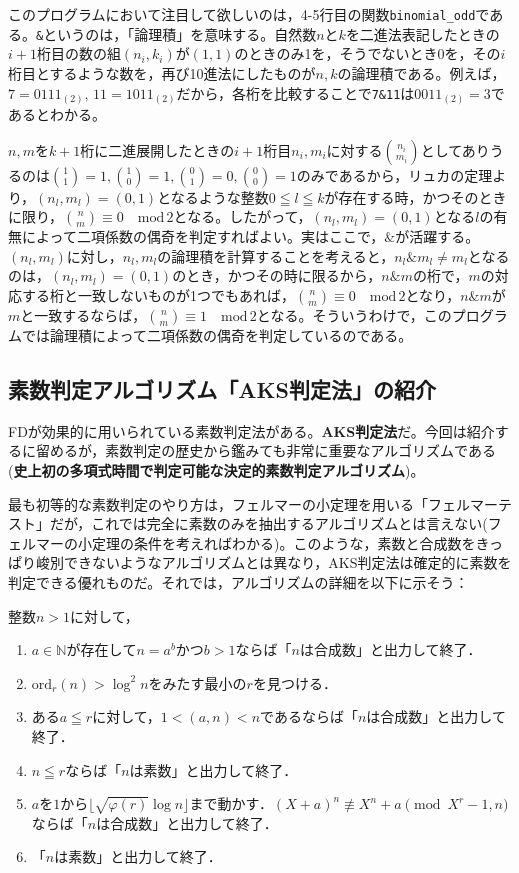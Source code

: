 このプログラムにおいて注目して欲しいのは，4-5行目の関数\texttt{binomial\_odd}である。\texttt{\&}というのは，「論理積」を意味する。自然数$n$と$k$を二進法表記したときの$i+1$桁目の数の組$(n_i,k_i)$が$(1,1)$のときのみ1を，そうでないとき0を，その$i$桁目とするような数を，再び10進法にしたものが$n,k$の論理積である。例えば，$7=0111{}_{(2)},\,11=1011{}_{(2)}$だから，各桁を比較することで\texttt{7\&11}は$0011{}_{(2)}=3$であるとわかる。

$n,m$を$k+1$桁に二進展開したときの$i+1$桁目$n_i,m_i$に対する$\binom{n_i}{m_i}$としてありうるのは$\binom{1}{1}=1,\binom{1}{0}=1,\binom{0}{1}=0,\binom{0}{0}=1$のみであるから，リュカの定理より，$(n_l,m_l)=(0,1)$となるような整数$0\leqq l \leqq k$が存在する時，かつそのときに限り，$\binom{n}{m}\equiv 0 \quad \mathrm{mod}\,2$となる。したがって，$(n_l,m_l)=(0,1)$となる$l$の有無によって二項係数の偶奇を判定すればよい。実はここで，$\mathtt{\&}$が活躍する。$(n_l,m_l)$に対し，$n_l,m_l$の論理積を計算することを考えると，$n_l\mathtt{\&}m_l\ne m_l$となるのは，$(n_l,m_l)=(0,1)$のとき，かつその時に限るから，$n\mathtt{\&}m$の桁で，$m$の対応する桁と一致しないものが1つでもあれば，$\binom{n}{m}\equiv 0\quad \mathrm{mod}\,2$となり，$n\mathtt{\&}m$が$m$と一致するならば，$\binom{n}{m}\equiv 1\quad\mathrm{mod}\,2$となる。そういうわけで，このプログラムでは論理積によって二項係数の偶奇を判定しているのである。

\subsection{素数判定アルゴリズム「AKS判定法」の紹介}
\textsf{FD}が効果的に用いられている素数判定法がある。\textbf{AKS判定法}だ。今回は紹介するに留めるが，素数判定の歴史から鑑みても非常に重要なアルゴリズムである(\textbf{史上初の多項式時間で判定可能な決定的素数判定アルゴリズム})。

最も初等的な素数判定のやり方は，フェルマーの小定理を用いる「フェルマーテスト」だが，これでは完全に素数のみを抽出するアルゴリズムとは言えない(フェルマーの小定理の条件を考えればわかる)。このような，素数と合成数をきっぱり峻別できないようなアルゴリズムとは異なり，AKS判定法は確定的に素数を判定できる優れものだ。それでは，アルゴリズムの詳細を以下に示そう：

整数$n>1$に対して，
\begin{enumerate}
    \item $a\in \mathbb{N}が存在してn=a^bかつb>1$ならば「$n$は合成数」と出力して終了．
    \item $\mathrm{ord}_r(n)>\log^2n$をみたす最小の$r$を見つける．
    \item ある$a\leqq r$に対して，$1<(a,n)<n$であるならば「$n$は合成数」と出力して終了．
    \item $n\leqq r$ならば「$n$は素数」と出力して終了．
    \item $a$を$1$から$\lfloor\sqrt{\varphi(r)}\log n\rfloor$まで動かす．$(X+a)^n\not\equiv X^n+a \pmod {X^r-1,n}$ならば「$n$は合成数」と出力して終了．
    \item 「$n$は素数」と出力して終了．
\end{enumerate}

